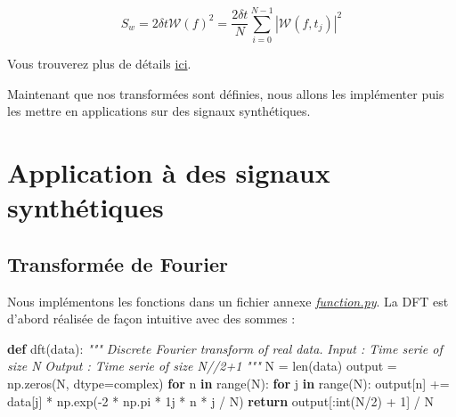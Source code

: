 \documentclass[11pt]{article}
\newenvironment{Shaded}{}{}
\newcommand{\KeywordTok}[1]{\textcolor[rgb]{0.00,0.44,0.13}{\textbf{{#1}}}}
\newcommand{\DecValTok}[1]{\textcolor[rgb]{0.25,0.63,0.44}{{#1}}}
\newcommand{\CommentTok}[1]{\textcolor[rgb]{0.38,0.63,0.69}{\textit{{#1}}}}
\newcommand{\NormalTok}[1]{{#1}}
\newcommand{\ControlFlowTok}[1]{\textcolor[rgb]{0.00,0.44,0.13}{\textbf{{#1}}}}
\newcommand{\OperatorTok}[1]{\textcolor[rgb]{0.40,0.40,0.40}{{#1}}}
\newcommand{\BuiltInTok}[1]{{#1}}
\begin{document}
\[S_w = 2 \delta t \mathcal{W}(f)^2 = \frac{2 \delta t}{N} \sum_{i=0}^{N-1} \left| \mathcal{W}(f, t_j) \right|^2\]

Vous trouverez plus de détails
\href{https://sites.lesia.obspm.fr/olga-alexandrova/files/2018/01/TP_M2_PPF_Alexandrova_Cecconi_2017_appendix.pdf}{ici}.

    Maintenant que nos transformées sont définies, nous allons les
implémenter puis les mettre en applications sur des signaux
synthétiques.

\hypertarget{application-uxe0-des-signaux-synthuxe9tiques}{%
\section{ Application à des signaux
synthétiques}\label{application-uxe0-des-signaux-synthuxe9tiques}}

\hypertarget{transformuxe9e-de-fourier}{%
\subsection{Transformée de Fourier}\label{transformuxe9e-de-fourier}}

    Nous implémentons les fonctions dans un fichier annexe
\href{https://github.com/gbogopolsky/spectral-analysis-astro/blob/master/function.py}{\emph{function.py}}.
La DFT est d'abord réalisée de façon intuitive avec des sommes :

\begin{Shaded}
\begin{Highlighting}[]
\KeywordTok{def}\NormalTok{ dft(data):}
    \CommentTok{"""}
\CommentTok{    Discrete Fourier transform of real data.}
\CommentTok{    Input : Time serie of size N}
\CommentTok{    Output : Time serie of size N//2+1}
\CommentTok{    """}
\NormalTok{    N }\OperatorTok{=} \BuiltInTok{len}\NormalTok{(data)}
\NormalTok{    output }\OperatorTok{=}\NormalTok{ np.zeros(N, dtype}\OperatorTok{=}\BuiltInTok{complex}\NormalTok{)}
    \ControlFlowTok{for}\NormalTok{ n }\KeywordTok{in} \BuiltInTok{range}\NormalTok{(N):}
        \ControlFlowTok{for}\NormalTok{ j }\KeywordTok{in} \BuiltInTok{range}\NormalTok{(N):}
\NormalTok{            output[n] }\OperatorTok{+=}\NormalTok{ data[j] }\OperatorTok{*}\NormalTok{ np.exp(}\OperatorTok{-}\DecValTok{2} \OperatorTok{*}\NormalTok{ np.pi }\OperatorTok{*}\NormalTok{ 1j }\OperatorTok{*}\NormalTok{ n }\OperatorTok{*}\NormalTok{ j }\OperatorTok{/}\NormalTok{ N)}
    \ControlFlowTok{return}\NormalTok{ output[:}\BuiltInTok{int}\NormalTok{(N}\OperatorTok{/}\DecValTok{2}\NormalTok{) }\OperatorTok{+} \DecValTok{1}\NormalTok{] }\OperatorTok{/}\NormalTok{ N}
\end{Highlighting}
\end{Shaded}
\end{document}
